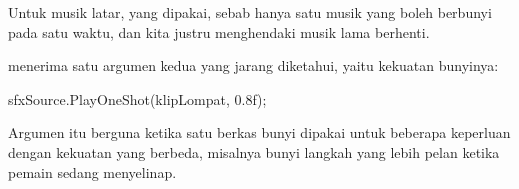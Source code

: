 Untuk musik latar,  yang dipakai, sebab hanya satu musik yang boleh
berbunyi pada satu waktu, dan kita justru menghendaki musik lama berhenti.

\begin{tipsbox}
 menerima satu argumen kedua yang jarang diketahui, yaitu
kekuatan bunyinya:

\begin{kodekeluaran}
sfxSource.PlayOneShot(klipLompat, 0.8f);
\end{kodekeluaran}

Argumen itu berguna ketika satu berkas bunyi dipakai untuk beberapa keperluan
dengan kekuatan yang berbeda, misalnya bunyi langkah yang lebih pelan ketika
pemain sedang menyelinap.
\end{tipsbox}
